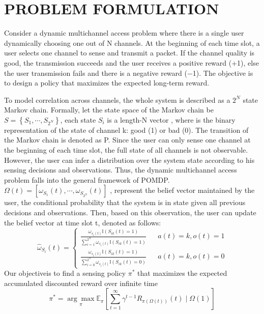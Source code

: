 \section{   PROBLEM FORMULATION   }
Consider a dynamic multichannel access problem where there is a single user dynamically choosing one out of N channels. At the beginning of each time slot, a user selects one channel to sense and transmit a packet. If the channel quality is good, the transmission succeeds and the user receives a positive reward (+1), else the user transmission fails and there is a negative reward (−1). The objective is to design a policy that maximizes the expected long-term reward. 

To model correlation across channels, the whole system is described as a $2^{N}$ state Markov chain. Formally, let the state space of the Markov chain be $S=\left\{S_{1},\cdots,S_{2^{N}}\right\}$, each state $S_{i}$  is a length-N vector , where is the binary representation of the state of channel k: good (1) or bad (0). 
The transition of the Markov chain is denoted as P. Since the user can only sense one channel at the beginning of each time slot, the full state of all channels is not observable. However, the user can infer a distribution over the system state according to his sensing decisions and observations. Thus, the dynamic multichannel access problem falls into the general framework of POMDP.$\Omega \left ( t \right )=\left [ \omega _{S_{1}} \left ( t \right ),\cdots,\omega _{S_{2^{N}}} \left ( t \right )\right ]$ , represent the belief vector maintained by the user, the conditional probability that the system is in state given all previous decisions and observations.
Then, based on this observation, the user can update the belief vector at time slot t, denoted as follows:
\begin{equation}\tag*{1}
\hat{\omega }_{S_{i}}\left ( t \right )=\left\{
\begin{aligned}
\frac{\omega _{s_{i}\left ( t \right )}\mathbb{I}\left ( S_{ik}\left ( t \right ) =1\right )}{\sum_{i=1}^{2^{N}}\omega _{s_{i}\left ( t \right )}\mathbb{I}\left ( S_{ik}\left ( t \right ) =1\right )}& & a(t)=k,o(t)=1\\
\frac{\omega _{s_{i}\left ( t \right )}\mathbb{I}\left ( S_{ik}\left ( t \right ) =1\right )}{\sum_{i=0}^{2^{N}}\omega _{s_{i}\left ( t \right )}\mathbb{I}\left ( S_{ik}\left ( t \right ) =0\right )}& & a(t)=k,o(t)=0
\end{aligned}
\right.
\end{equation}
Our objectiveis to ﬁnd a sensing policy $\pi^{*}$ that maximizes the expected accumulated discounted reward over inﬁnite time 
\begin{equation}\tag*{2}
\pi ^{*}= \underset{\pi }{\arg \max}\mathbb{E}_{\pi}\left [ \sum_{t=1}^{\infty }\gamma ^{t-1} R_{\pi\left ( \Omega \left ( t \right ) \right )}\left ( t \right )\mid \Omega \left ( 1 \right )\right ]
\end{equation}

